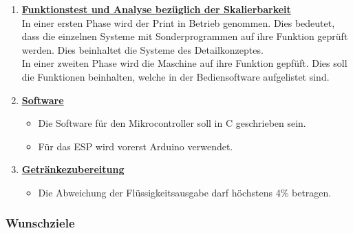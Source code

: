 \begin{enumerate}
\item \underline{\textbf{Funktionstest und Analyse bezüglich der Skalierbarkeit}}\mbox{}\\
			
In einer ersten Phase wird der Print in Betrieb genommen. Dies bedeutet, dass die einzelnen Systeme mit Sonderprogrammen auf ihre Funktion geprüft werden. Dies beinhaltet die Systeme des Detailkonzeptes.\\

In einer zweiten Phase wird die Maschine auf ihre Funktion gepfüft. Dies soll die Funktionen beinhalten, welche in der Bediensoftware aufgelistet sind.\\
			
			 
\item \underline{\textbf{Software}}\mbox{}\\
\begin{itemize}
\item Die Software für den Mikrocontroller soll in C geschrieben sein. 
			
\item Für das ESP wird vorerst Arduino verwendet.\\
\end{itemize}

\item \underline{\textbf{Getränkezubereitung}}\mbox{}\\
\begin{itemize}
\item Die Abweichung der Flüssigkeitsausgabe darf höchstens 4\% betragen. \\
\end{itemize}
			
\end{enumerate}	
\newpage
\subsubsection{Wunschziele}\label{sec:Wunschziele}

